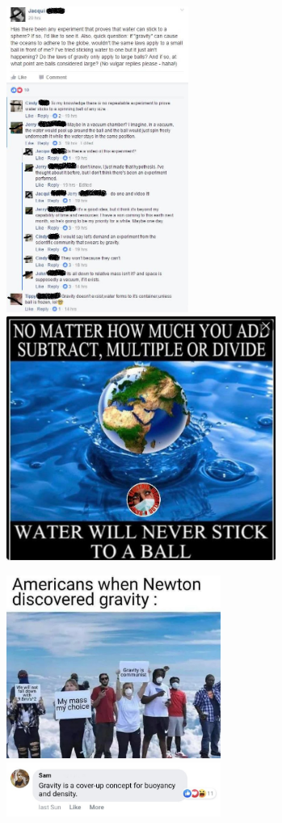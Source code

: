 \includegraphics[height=10cm]{images/gravity_stupid/stupid11}
\includegraphics[height=8cm]{images/gravity_stupid/stupid12}

\includegraphics[width=7cm]{images/gravity_stupid/stupid13}
\includegraphics[width=7cm]{images/gravity_stupid/stupid14}
